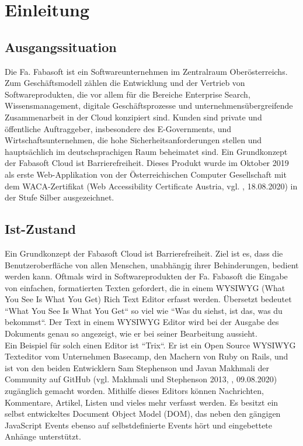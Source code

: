 \chapter{Einleitung}
\section{Ausgangssituation}
Die Fa. Fabasoft ist ein Softwareunternehmen im Zentralraum Oberösterreichs. Zum Geschäftsmodell zählen die Entwicklung und der Vertrieb von Softwareprodukten, die vor allem für die Bereiche Enterprise Search, Wissensmanagement, digitale Geschäftsprozesse und unternehmensübergreifende Zusammenarbeit in der Cloud konzipiert sind. Kunden sind private und öffentliche Auftraggeber, insbesondere des E-Governments, und Wirtschaftsunternehmen, die hohe Sicherheitsanforderungen stellen und hauptsächlich im deutschsprachigen Raum beheimatet sind. Ein Grundkonzept der Fabasoft Cloud ist Barrierefreiheit. Dieses Produkt wurde im Oktober 2019 als erste Web-Applikation von der Österreichischen Computer Gesellschaft mit dem WACA-Zertifikat (Web Accessibility Certificate Austria, vgl. \cite{waca_zertifikate_2020}, 18.08.2020) in der Stufe Silber ausgezeichnet.

\section{Ist-Zustand}
Ein Grundkonzept der Fabasoft Cloud ist Barrierefreiheit. Ziel ist es, dass die Benutzeroberfläche von allen Menschen, unabhängig ihrer Behinderungen, bedient werden kann.
Oftmals wird in Softwareprodukten der Fa. Fabasoft die Eingabe von einfachen, formatierten Texten gefordert, die in einem WYSIWYG (What You See Is What You Get) Rich Text Editor erfasst werden. 
Übersetzt bedeutet ``What You See Is What You Get`` so viel wie ``Was du siehst, ist das, was du bekommst``. Der Text in einem WYSIWYG Editor wird bei der Ausgabe des Dokuments genau so angezeigt, wie er bei seiner Bearbeitung aussieht.\\
Ein Beispiel für solch einen Editor ist ``Trix``. Er ist ein Open Source WYSIWYG Texteditor vom Unternehmen Basecamp, den Machern von Ruby on Rails, und ist von den beiden Entwicklern Sam Stephenson und Javan Makhmali der Community auf GitHub (vgl. Makhmali und Stephenson 2013, \cite{basecamp_trix_2013}, 09.08.2020) zugänglich gemacht worden. Mithilfe dieses Editors können Nachrichten, Kommentare, Artikel, Listen und vieles mehr verfasst werden. Es besitzt ein selbst entwickeltes Document Object Model (DOM), das neben den gängigen JavaScript Events ebenso auf selbstdefinierte Events hört und eingebettete Anhänge unterstützt.

